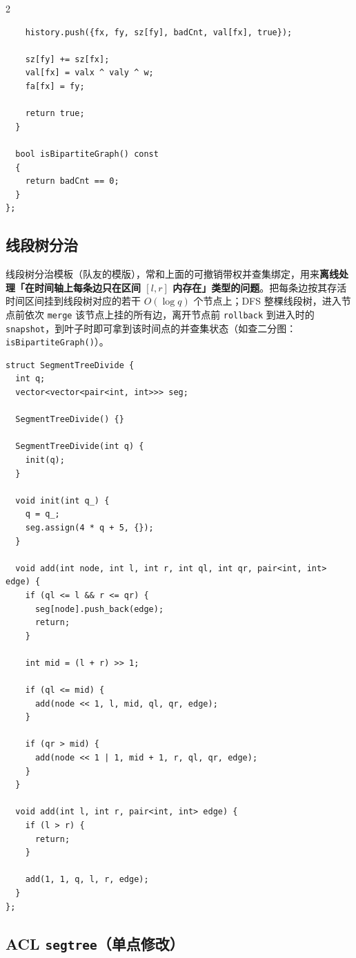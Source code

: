 \begin{multicols*}{2}
\begin{verbatim}
    history.push({fx, fy, sz[fy], badCnt, val[fx], true});

    sz[fy] += sz[fx];
    val[fx] = valx ^ valy ^ w;
    fa[fx] = fy;

    return true;
  }

  bool isBipartiteGraph() const
  {
    return badCnt == 0;
  }
};
	\end{verbatim}

	\subsection{线段树分治}

	线段树分治模板（队友的模版），常和上面的可撤销带权并查集绑定，用来\textbf{离线处理「在时间轴上每条边只在区间 $[l, r]$ 内存在」类型的问题}。把每条边按其存活时间区间挂到线段树对应的若干 $O(\log q)$ 个节点上；DFS 整棵线段树，进入节点前依次 \verb|merge| 该节点上挂的所有边，离开节点前 \verb|rollback| 到进入时的 \verb|snapshot|，到叶子时即可拿到该时间点的并查集状态（如查二分图：\verb|isBipartiteGraph()|）。

	\begin{verbatim}
struct SegmentTreeDivide {
  int q;
  vector<vector<pair<int, int>>> seg;

  SegmentTreeDivide() {}

  SegmentTreeDivide(int q) {
    init(q);
  }

  void init(int q_) {
    q = q_;
    seg.assign(4 * q + 5, {});
  }

  void add(int node, int l, int r, int ql, int qr, pair<int, int> edge) {
    if (ql <= l && r <= qr) {
      seg[node].push_back(edge);
      return;
    }

    int mid = (l + r) >> 1;

    if (ql <= mid) {
      add(node << 1, l, mid, ql, qr, edge);
    }

    if (qr > mid) {
      add(node << 1 | 1, mid + 1, r, ql, qr, edge);
    }
  }

  void add(int l, int r, pair<int, int> edge) {
    if (l > r) {
      return;
    }

    add(1, 1, q, l, r, edge);
  }
};
	\end{verbatim}

\end{multicols*}

	\subsection[\tochl{ACL \texttt{segtree}（单点修改）}]{ACL \texttt{segtree}（单点修改）}
	

